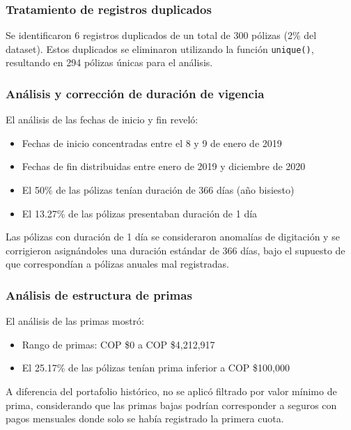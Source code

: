 \subsubsection{Tratamiento de registros duplicados}

Se identificaron 6 registros duplicados de un total de 300 pólizas (2\% del dataset). Estos duplicados se eliminaron utilizando la función \texttt{unique()}, resultando en 294 pólizas únicas para el análisis.

\subsubsection{Análisis y corrección de duración de vigencia}

El análisis de las fechas de inicio y fin reveló:

\begin{itemize}
    \item Fechas de inicio concentradas entre el 8 y 9 de enero de 2019
    \item Fechas de fin distribuidas entre enero de 2019 y diciembre de 2020
    \item El 50\% de las pólizas tenían duración de 366 días (año bisiesto)
    \item El 13.27\% de las pólizas presentaban duración de 1 día
\end{itemize}

Las pólizas con duración de 1 día se consideraron anomalías de digitación y se corrigieron asignándoles una duración estándar de 366 días, bajo el supuesto de que correspondían a pólizas anuales mal registradas.

\subsubsection{Análisis de estructura de primas}

El análisis de las primas mostró:

\begin{itemize}
    \item Rango de primas: COP \$0 a COP \$4,212,917
    \item El 25.17\% de las pólizas tenían prima inferior a COP \$100,000
\end{itemize}

A diferencia del portafolio histórico, no se aplicó filtrado por valor mínimo de prima, considerando que las primas bajas podrían corresponder a seguros con pagos mensuales donde solo se había registrado la primera cuota.

